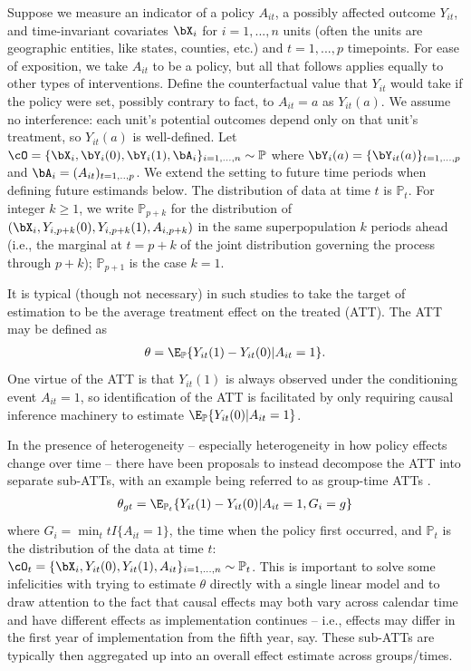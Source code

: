 \documentclass{article}
\renewcommand{\P}{\mathbb{P}}
\begin{document}
Suppose we measure an indicator of a policy $A_{it}$, a possibly affected outcome $Y_{it}$, and time-invariant covariates $\bX_i$ for $i = 1, ..., n$ units (often the units are geographic entities, like states, counties, etc.) and $t = 1, ..., p$ timepoints. For ease of exposition, we take $A_{it}$ to be a policy, but all that follows applies equally to other types of interventions. Define the counterfactual value that $Y_{it}$ would take if the policy were set, possibly contrary to fact, to $A_{it} = a$ as $Y_{it}(a)$. We assume no interference: each unit's potential outcomes depend only on that unit's treatment, so $Y_{it}(a)$ is well-defined. Let $\cO = \{\bX_i, \bY_{i}(0), \bY_{i}(1), \bA_{i}\}_{i = 1, ..., n} \sim \P$ where $\bY_i(a) = \{\bY_{it}(a)\}_{t = 1, ..., p}$ and $\bA_i = (A_{it})_{t = 1,.., p}$. We extend the setting to future time periods when defining future estimands below. The distribution of data at time $t$ is $\P_t$. For integer $k \geq 1$, we write $\P_{p+k}$ for the distribution of $(\bX_i, Y_{i,p+k}(0), Y_{i,p+k}(1), A_{i,p+k})$ in the same superpopulation $k$ periods ahead (i.e., the marginal at $t = p+k$ of the joint distribution governing the process through $p+k$); $\P_{p+1}$ is the case $k=1$. 

It is typical (though not necessary) in such studies to take the target of estimation to be the average treatment effect on the treated (ATT). The ATT may be defined as
\begin{align*}
    \theta = \E_\P\{Y_{it}(1) - Y_{it}(0) | A_{it} = 1\}.
\end{align*}
One virtue of the ATT is that $Y_{it}(1)$ is always observed under the conditioning event $A_{it} = 1$, so identification of the ATT is facilitated by only requiring causal inference machinery to estimate $\E_\P\{Y_{it}(0) | A_{it} = 1\}$.

In the presence of heterogeneity -- especially heterogeneity in how policy effects change over time -- there have been proposals to instead decompose the ATT into separate sub-ATTs, with an example being referred to as group-time ATTs \citep{sunEstimatingDynamicTreatment2021}.
\begin{align*}
    \theta_{gt} = \E_{\P_t}\{Y_{it}(1) - Y_{it}(0) | A_{it} = 1, G_{i} = g\}
\end{align*}
where $G_i = \min_t tI\{A_{it} = 1\}$, the time when the policy first occurred, and $\P_t$ is the distribution of the data at time $t$: $\cO_t = \{\bX_i, Y_{it}(0), Y_{it}(1), A_{it}\}_{i = 1, ..., n} \sim \P_t$. This is important to solve some infelicities with trying to estimate $\theta$ directly with a single linear model \citep{sunEstimatingDynamicTreatment2021} and to draw attention to the fact that causal effects may both vary across calendar time and have different effects as implementation continues -- i.e., effects may differ in the first year of implementation from the fifth year, say. These sub-ATTs are typically then aggregated up into an overall effect estimate across groups/times.
\end{document}
